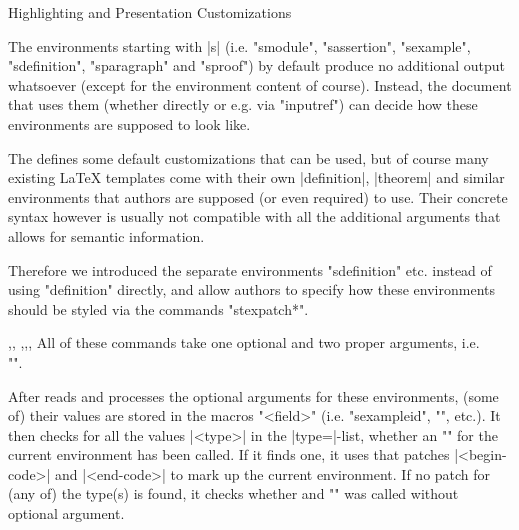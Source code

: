 \begin{sfragment}[id=sec.customhighlight]{Highlighting and Presentation Customizations}

  The environments starting with |s| (i.e. \stexcode"smodule", \stexcode"sassertion",
  \stexcode"sexample", \stexcode"sdefinition", \stexcode"sparagraph" and
  \stexcode"sproof") by default produce no additional output whatsoever (except for the
  environment content of course). Instead, the document that uses them (whether directly
  or e.g. via \stexcode"inputref") can decide how these environments are supposed to look
  like.

  The  defines some default customizations that can be used, but of course
  many existing \LaTeX\xspace templates come with their own |definition|, |theorem| and
  similar environments that authors are supposed (or even required) to use. Their concrete
  syntax however is usually not compatible with all the additional arguments that \sTeX
  allows for semantic information.

  Therefore we introduced the separate environments \stexcode"sdefinition" etc.  instead
  of using \stexcode"definition" directly, and allow authors to specify how these
  environments should be styled via the commands \stexcode"stexpatch*".

  \begin{function}{\stexpatchmodule,\stexpatchdefinition,
      \stexpatchassertion,\stexpatchexample,\stexpatchparagraph,
      \stexpatchproof}
    All of these commands take one optional and two proper arguments, i.e.\\
    \stexcode"".

    After \stex reads and processes the optional arguments for these environments, (some
    of) their values are stored in the macros \stexcode"\s*<field>"
    (i.e. \stexcode"sexampleid", \stexcode"\sassertionname", etc.). It then checks for all
    the values |<type>| in the |type=|-list, whether an \stexcode"\stexpatch*[<type>]" for
    the current environment has been called. If it finds one, it uses that patches
    |<begin-code>| and |<end-code>| to mark up the current environment. If no patch for
    (any of) the type(s) is found, it checks whether and \stexcode"\stexpatch*" was called
    without optional argument.
  \end{function}


\end{sfragment}
